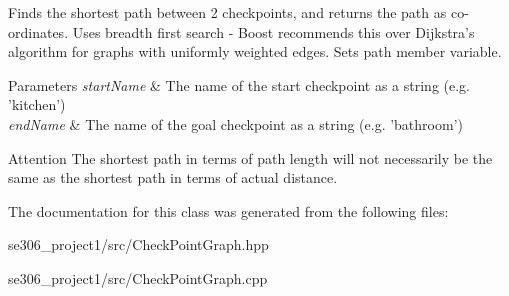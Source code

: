 Finds the shortest path between 2 checkpoints, and returns the path as co-\/ordinates. Uses breadth first search -\/ Boost recommends this over Dijkstra's algorithm for graphs with uniformly weighted edges. Sets path member variable. 


\begin{DoxyParams}{Parameters}
{\em start\-Name} & The name of the start checkpoint as a string (e.\-g. 'kitchen') \\
\hline
{\em end\-Name} & The name of the goal checkpoint as a string (e.\-g. 'bathroom') \\
\hline
\end{DoxyParams}
\begin{DoxyAttention}{Attention}
The shortest path in terms of path length will not necessarily be the same as the shortest path in terms of actual distance. 
\end{DoxyAttention}


The documentation for this class was generated from the following files\-:\begin{DoxyCompactItemize}
\item 
se306\-\_\-project1/src/Check\-Point\-Graph.\-hpp\item 
se306\-\_\-project1/src/Check\-Point\-Graph.\-cpp\end{DoxyCompactItemize}
